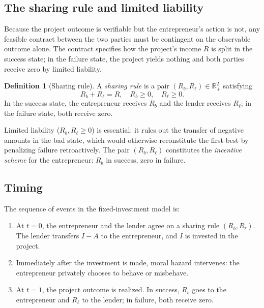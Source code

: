 \documentclass[11pt,a4paper,oneside]{book}
\def\R{\mathbb{R}}
\def\geq{\geqslant}
\theoremstyle{plain}
\theoremstyle{definition}
\newtheorem{definition}[theorem]{Definition}
\theoremstyle{remark}
\numberwithin{equation}{chapter}
\begin{document}
\subsection{The sharing rule and limited liability}

Because the project outcome is verifiable but the entrepreneur's action is not, any feasible contract between the two parties must be contingent on the observable outcome alone.
The contract specifies how the project's income $R$ is split in the success state; in the failure state, the project yields nothing and both parties receive zero by limited liability.

\begin{definition}[Sharing rule]\label{def:sharing-rule}
A \emph{sharing rule} is a pair $(R_b, R_\ell) \in \R_+^2$ satisfying
\begin{equation}\label{eq:HT-sharing}
  R_b + R_\ell = R, \quad R_b \geq 0, \quad R_\ell \geq 0.
\end{equation}
In the success state, the entrepreneur receives $R_b$ and the lender receives $R_\ell$; in the failure state, both receive zero.
\end{definition}

Limited liability ($R_b, R_\ell \geq 0$) is essential: it rules out the transfer of negative amounts in the bad state, which would otherwise reconstitute the first-best by penalizing failure retroactively.
The pair $(R_b, R_\ell)$ constitutes the \emph{incentive scheme} for the entrepreneur: $R_b$ in success, zero in failure.

\subsection{Timing}

The sequence of events in the fixed-investment model is:
\begin{enumerate}
  \item At $t=0$, the entrepreneur and the lender agree on a sharing rule $(R_b, R_\ell)$.
  The lender transfers $I - A$ to the entrepreneur, and $I$ is invested in the project.
  \item Immediately after the investment is made, moral hazard intervenes: the entrepreneur privately chooses to behave or misbehave.
  \item At $t=1$, the project outcome is realized.
  In success, $R_b$ goes to the entrepreneur and $R_\ell$ to the lender; in failure, both receive zero.
\end{enumerate}
\end{document}
